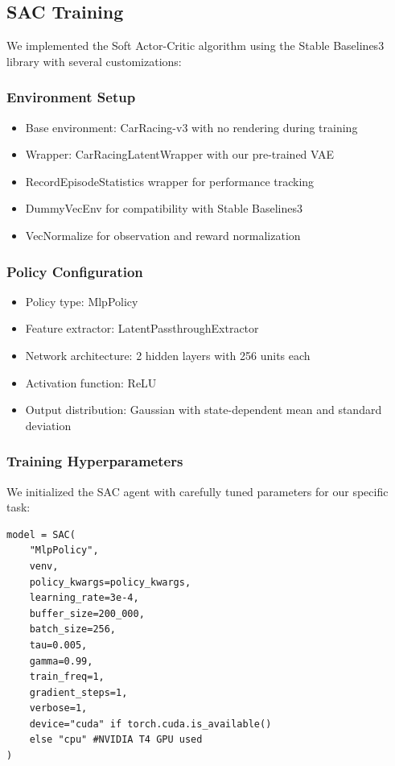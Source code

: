 \documentclass[conference]{IEEEtran}
\begin{document}
\subsection{SAC Training}

We implemented the Soft Actor-Critic algorithm using the Stable Baselines3 library with several customizations:

\subsubsection{Environment Setup}
\begin{itemize}
    \item Base environment: CarRacing-v3 with no rendering during training
    \item Wrapper: CarRacingLatentWrapper with our pre-trained VAE
    \item RecordEpisodeStatistics wrapper for performance tracking
    \item DummyVecEnv for compatibility with Stable Baselines3
    \item VecNormalize for observation and reward normalization
\end{itemize}

\subsubsection{Policy Configuration}
\begin{itemize}
    \item Policy type: MlpPolicy
    \item Feature extractor: LatentPassthroughExtractor
    \item Network architecture: 2 hidden layers with 256 units each
    \item Activation function: ReLU
    \item Output distribution: Gaussian with state-dependent mean and standard deviation
\end{itemize}

\subsubsection{Training Hyperparameters}
We initialized the SAC agent with carefully tuned parameters for our specific task:

\begin{verbatim}
model = SAC(
    "MlpPolicy",
    venv,
    policy_kwargs=policy_kwargs,
    learning_rate=3e-4,
    buffer_size=200_000,
    batch_size=256,
    tau=0.005,
    gamma=0.99,
    train_freq=1,
    gradient_steps=1,
    verbose=1,
    device="cuda" if torch.cuda.is_available() 
    else "cpu" #NVIDIA T4 GPU used
)
\end{verbatim}
\end{document}

